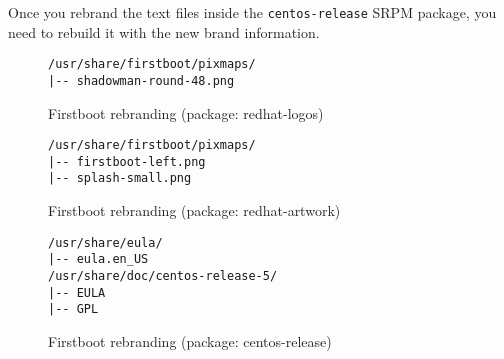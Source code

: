 Once you rebrand the text files inside the \texttt{centos-release}
SRPM package, you need to rebuild it with the new brand information.

\begin{figure}[!hbp]
\hrulefill
\begin{verbatim}
/usr/share/firstboot/pixmaps/
|-- shadowman-round-48.png
\end{verbatim}
\hrulefill
\caption{Firstboot rebranding (package: redhat-logos)%
   \label{fig:Distribution:Anaconda:Firstboot:Rebranding:Logos}}
\end{figure}

\begin{figure}[!hbp]
\hrulefill
\begin{verbatim}
/usr/share/firstboot/pixmaps/
|-- firstboot-left.png
|-- splash-small.png
\end{verbatim}
\hrulefill
\caption{Firstboot rebranding (package: redhat-artwork)%
   \label{fig:Distribution:Anaconda:Firstboot:Rebranding:Artwork}}
\end{figure}

\begin{figure}[!hbp]
\hrulefill
\begin{verbatim}
/usr/share/eula/
|-- eula.en_US
/usr/share/doc/centos-release-5/
|-- EULA
|-- GPL
\end{verbatim}
\hrulefill
\caption{Firstboot rebranding (package: centos-release)%
   \label{fig:Distribution:Anaconda:Firstboot:Rebranding:Release}}
\end{figure}
\begin{verbatim}
\end{verbatim}
